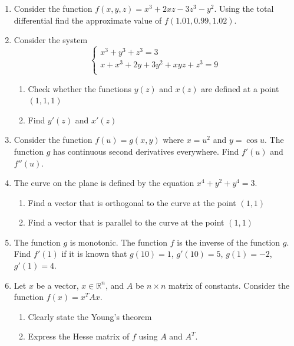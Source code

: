 \documentclass[12pt]{article} %
\theoremstyle{definition} %
\begin{document}
\begin{enumerate}

\item Consider the function $f(x,y,z)=x^3+2xz-3z^3-y^2$. Using the total differential find the approximate value of $f(1.01,0.99,1.02)$.

\item Consider the system
\[
\begin{cases}
x^3 + y^3 + z^3 = 3 \\
x + x^3 + 2y + 3y^2 + xyz + z^3 = 9 \\
\end{cases}
\]
\begin{enumerate}
  \item Check whether the functions $y(z)$ and $x(z)$ are defined at a point $(1, 1, 1)$
  \item Find $y'(z)$ and $x'(z)$
\end{enumerate}

\item Consider the function $f(u)=g(x,y)$ where $x=u^2$ and $y=\cos u$. The function $g$ has continuous second derivatives everywhere. Find $f'(u)$ and $f''(u)$.

\item The curve on the plane is defined by the equation $x^4 + y^2 + y^4 = 3$.
\begin{enumerate}
  \item Find a vector that is orthogonal to the curve at the point $(1, 1)$
  \item Find a vector that is parallel to the curve at the point $(1, 1)$
\end{enumerate}

\item The function $g$ is monotonic. The function $f$ is the inverse of the function $g$. Find $f'(1)$ if it is known that $g(10)=1$, $g'(10)=5$, $g(1)=-2$, $g'(1)=4$.

\item Let $x$ be a vector, $x\in \mathbb{R}^n$, and $A$ be $n\times n$ matrix of constants. Consider the function $f(x) = x^T A x$.
\begin{enumerate}
 \item Clearly state the Young's theorem
 \item Express the Hesse matrix of $f$ using $A$ and $A^T$.
\end{enumerate}





\end{enumerate}
\end{document}
